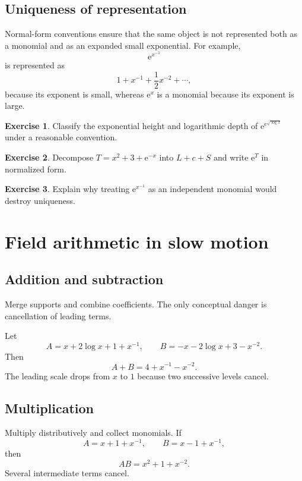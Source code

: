 \documentclass[11pt,oneside,openany]{book}
\newcommand{\e}{\mathrm{e}}
\theoremstyle{plain}
\theoremstyle{definition}
\newtheorem{exercise}{Exercise}[chapter]
\theoremstyle{remark}
\begin{document}
\section{Uniqueness of representation}
Normal-form conventions ensure that the same object is not represented both as a monomial and as an expanded small exponential. For example,
\[
  \e^{x^{-1}}
\]
is represented as
\[
  1+x^{-1}+\frac12x^{-2}+\cdots,
\]
because its exponent is small, whereas $\e^x$ is a monomial because its exponent is large.

\begin{exercise}
Classify the exponential height and logarithmic depth of $\e^{\e^{\sqrt{\log x}}}$ under a reasonable convention.
\end{exercise}

\begin{exercise}
Decompose $T=x^2+3+\e^{-x}$ into $L+c+S$ and write $\e^T$ in normalized form.
\end{exercise}

\begin{exercise}
Explain why treating $\e^{x^{-1}}$ as an independent monomial would destroy uniqueness.
\end{exercise}


\chapter{Field arithmetic in slow motion}
\label{ch:arithmetic}

\section{Addition and subtraction}
Merge supports and combine coefficients. The only conceptual danger is cancellation of leading terms.

\begin{worked}
Let
\[
  A=x+2\log x+1+x^{-1},
  \qquad
  B=-x-2\log x+3-x^{-2}.
\]
Then
\[
  A+B=4+x^{-1}-x^{-2}.
\]
The leading scale drops from $x$ to $1$ because two successive levels cancel.
\end{worked}

\section{Multiplication}
Multiply distributively and collect monomials. If
\[
  A=x+1+x^{-1},
  \qquad B=x-1+x^{-1},
\]
then
\[
  AB=x^2+1+x^{-2}.
\]
Several intermediate terms cancel.
\end{document}
